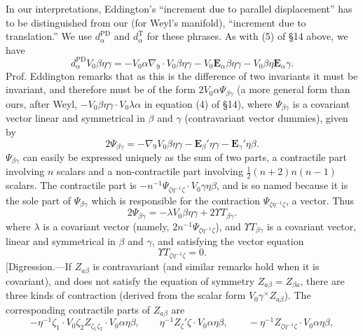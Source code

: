 \documentclass[11pt]{article}
\begin{document}
\indent In our interpretations, Eddington's ``increment due to parallel displacement'' has to be distinguished from our (for Weyl's manifold), ``increment due to translation.'' We use $d_\alpha^{\mathrm{PD}}$ and $d_\alpha^{\mathrm{T}}$ for these phrases. As with (5) of \S14 above, we have
\[
d_\alpha^{\mathrm{PD}}V_0\beta\eta\gamma=-V_0\alpha\nabla_9\mathbin{\cdot}V_0\beta\eta\gamma-V_0\mathbf{E}_\alpha\beta\eta\gamma-V_0\beta\eta\mathbf{E}_\alpha\gamma.
\]
Prof. Eddington remarks that as this is the difference of two invariants it must be invariant, and therefore must be of the form $2V_0\alpha\Psi_{\beta\gamma}$ (a more general form than ours, after Weyl, $-V_0\beta\eta\gamma\mathbin{\cdot}V_0\lambda\alpha$ in equation (4) of \S14), where $\Psi_{\beta\gamma}$ is a covariant vector linear and symmetrical in $\beta$ and $\gamma$ (contravariant vector dummies), given by
\begin{equation}2\Psi_{\beta\gamma}=-\nabla_9V_0\beta\eta\gamma-\mathbf{E}_\beta'\eta\gamma-\mathbf{E}_\gamma'\eta\beta.\tag{4}\end{equation}
\indent $\Psi_{\beta\gamma}$ can easily be expressed uniquely as the sum of two parts, a contractile part involving $n$ scalars and a non-contractile part involving $\tfrac12(n+2)n(n-1)$ scalars. The contractile part is $-n^{-1}\Psi_{\zeta\eta^{-1}\zeta}\mathbin{\cdot}V_0\gamma\eta\beta$, and is so named because it is the sole part of $\Psi_{\beta\gamma}$ which is responsible for the contraction $\Psi_{\zeta\eta^{-1}\zeta}$, a vector. Thus
\begin{equation}2\Psi_{\beta\gamma}=-\lambda V_0\beta\eta\gamma+2\Upsilon{T}_{\beta\gamma}.\tag{5}\end{equation}
where $\lambda$ is a covariant vector (namely, $2n^{-1}\Psi_{\zeta\eta^{-1}\zeta}$), and $\Upsilon{T}_{\beta\gamma}$ is a covariant vector, linear and symmetrical in $\beta$ and $\gamma$, and satisfying the vector equation
\begin{equation}\Upsilon{T}_{\zeta\eta^{-1}\zeta}=0.\tag{6}\end{equation}
\indent [Digression.---If $Z_{a\beta}$ is contravariant (and similar remarks hold when it is covariant), and does not satisfy the equation of symmetry $Z_{a\beta}=Z_{\beta a}$, there are three kinds of contraction (derived from the scalar form $V_0\gamma^\times Z_{a\beta}$). The corresponding contractile parts of $Z_{a\beta}$ are
\[
-\eta^{-1}\zeta_1\mathbin{\cdot}V_0\zeta_2Z_{\zeta_1\zeta_2}\mathbin{\cdot}V_0\alpha\eta\beta,\qquad \eta^{-1}Z_\zeta'\zeta\mathbin{\cdot}V_0\alpha\eta\beta,\qquad -\eta^{-1}Z_{\zeta\eta^{-1}\zeta}\mathbin{\cdot}V_0\alpha\eta\beta,
\]
\end{document}
